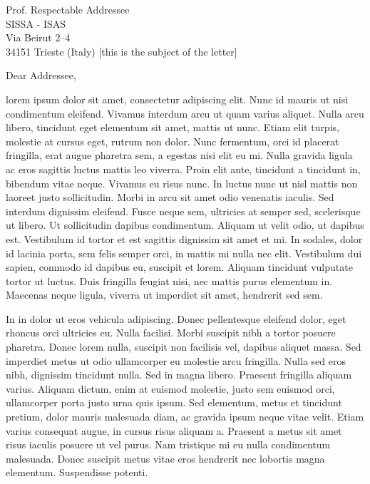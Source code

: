 \documentclass[10pt,english,a4paper]{letteracdp}
\date{December 5, 2009} %
\begin{document}
\begin{foldedletter}{
    Prof. Respectable Addressee\\
    SISSA - ISAS\\
    Via Beirut 2--4\\
    34151 Trieste (Italy)
  }
  [this is the subject of the letter]

  \opening[Trieste,]{Dear Addressee,}

lorem ipsum dolor sit amet, consectetur adipiscing elit. Nunc id mauris ut nisi condimentum eleifend. Vivamus interdum arcu ut quam varius aliquet. Nulla arcu libero, tincidunt eget elementum sit amet, mattis ut nunc. Etiam elit turpis, molestie at cursus eget, rutrum non dolor. Nunc fermentum, orci id placerat fringilla, erat augue pharetra sem, a egestas nisi elit eu mi. Nulla gravida ligula ac eros sagittis luctus mattis leo viverra. Proin elit ante, tincidunt a tincidunt in, bibendum vitae neque. Vivamus eu risus nunc. In luctus nunc ut nisl mattis non laoreet justo sollicitudin. Morbi in arcu sit amet odio venenatis iaculis. Sed interdum dignissim eleifend. Fusce neque sem, ultricies at semper sed, scelerisque ut libero. Ut sollicitudin dapibus condimentum. Aliquam ut velit odio, ut dapibus est. Vestibulum id tortor et est sagittis dignissim sit amet et mi. In sodales, dolor id lacinia porta, sem felis semper orci, in mattis mi nulla nec elit. Vestibulum dui sapien, commodo id dapibus eu, suscipit et lorem. Aliquam tincidunt vulputate tortor ut luctus. Duis fringilla feugiat nisi, nec mattis purus elementum in. Maecenas neque ligula, viverra ut imperdiet sit amet, hendrerit sed sem.

In in dolor ut eros vehicula adipiscing. Donec pellentesque eleifend dolor, eget rhoncus orci ultricies eu. Nulla facilisi. Morbi suscipit nibh a tortor posuere pharetra. Donec lorem nulla, suscipit non facilisis vel, dapibus aliquet massa. Sed imperdiet metus ut odio ullamcorper eu molestie arcu fringilla. Nulla sed eros nibh, dignissim tincidunt nulla. Sed in magna libero. Praesent fringilla aliquam varius. Aliquam dictum, enim at euismod molestie, justo sem euismod orci, ullamcorper porta justo urna quis ipsum. Sed elementum, metus et tincidunt pretium, dolor mauris malesuada diam, ac gravida ipsum neque vitae velit. Etiam varius consequat augue, in cursus risus aliquam a. Praesent a metus sit amet risus iaculis posuere ut vel purus. Nam tristique mi eu nulla condimentum malesuada. Donec suscipit metus vitae eros hendrerit nec lobortis magna elementum. Suspendisse potenti.


\end{foldedletter}
\end{document}
